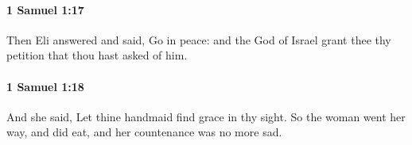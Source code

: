 		\paragraph{1 Samuel 1:17} %
			\label{1SAMUEL-1-17}

			Then Eli answered and said, Go in peace: and the God of Israel grant thee thy petition that thou hast asked of him.


		\paragraph{1 Samuel 1:18} %
			\label{1SAMUEL-1-18}

			And she said, Let thine handmaid find grace in thy sight. So the woman went her way, and did eat, and her countenance was no more sad.


